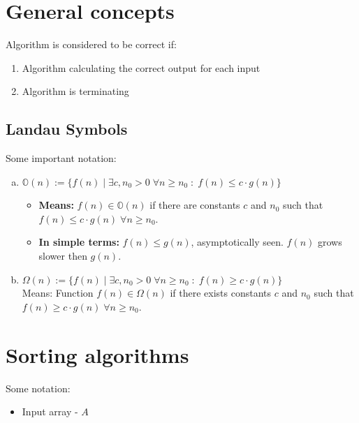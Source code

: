 \documentclass[a4paper,
  twoside, %
  headlines=2.1 %
  ]{scrartcl}
\author{\yourname}
\title{\lecture}
\date{} %
\begin{document}
\section*{General concepts}
Algorithm is considered to be correct if:

\begin{enumerate}
    \item Algorithm calculating the correct output for each input
    \item Algorithm is terminating
\end{enumerate}

\subsection*{Landau Symbols}

Some important notation:
\begin{enumerate}[(a)]
    \item $\mathbb{O}(n) := \{f(n) \;|\; \exists c, n_0 > 0 \; \forall n \geq n_0 \; : \; f(n) \leq c \cdot g(n)\}$
    \begin{itemize}
        \item \textbf{Means:} $f(n) \in \mathbb{O}(n)$ if there are constants $c$ and $n_0$ such that $f(n) \leq c \cdot g(n) \; \forall n \geq n_0$.
        \item \textbf{In simple terms:} $f(n) \leq g(n)$, asymptotically seen. $f(n)$ grows slower then $g(n)$.
    \end{itemize}

    \item $\Omega(n) := \{f(n) \; | \; \exists c, n_0 > 0 \; \forall n \geq n_0 \; : \; f(n) \geq c \cdot g(n)\}$ \\
     Means: Function $f(n) \in \Omega(n)$ if there exists constants $c$ and $n_0$ such that $f(n) \geq c \cdot g(n) \; \forall n \geq n_0$.
    


     
\end{enumerate}
\section*{Sorting algorithms}
    Some notation:
    \begin{itemize}
        \item Input array - $A$
    \end{itemize}
\end{document}

